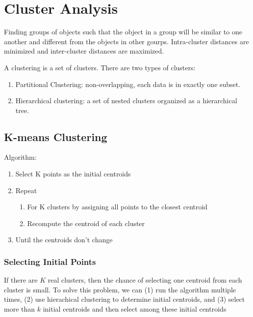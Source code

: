 \chapter{Cluster Analysis}

\begin{multicols}{2}

\noindent Finding groups of objects such that the object in a group will be similar to one another and different from the objects in other gourps. Intra-cluster distances are minimized and inter-cluster distances are maximized. 

\noindent A clustering is a set of clusters. There are two types of clusters:

\begin{enumerate}
    \item Partitional Clustering: non-overlapping, each data is in exactly one subset.
    \item Hierarchical clustering: a set of nested clusters organized as a hierarchical tree. 
\end{enumerate}

\section{K-means Clustering}

\noindent Algorithm:

\begin{enumerate}
    \item Select K points as the initial centroids
    \item Repeat
    \begin{enumerate}
        \item For K clusters by assigning all points to the closest centroid
        \item Recompute the centroid of each cluster
    \end{enumerate}
    \item Until the centroids don't change
\end{enumerate}

\subsection{Selecting Initial Points}

\noindent If there are $K$ real clusters, then the chance of selecting one centroid from each cluster is small. To solve this problem, we can (1) run the algorithm multiple times, (2) use hierachical clustering to determine initial centroids, and (3) select more than $k$ initial centroids and then select among these initial centroids


\end{multicols}
